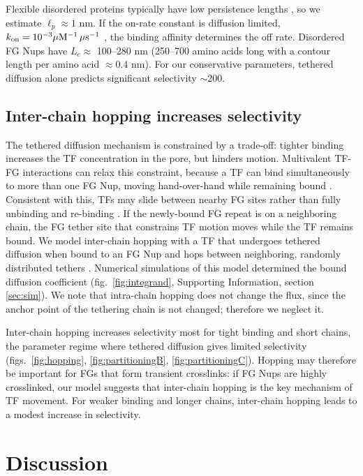 Flexible disordered proteins typically have low persistence lengths
\cite{receveur-brechot12}, so we estimate $\ell_p \approx 1$ nm.  If
the on-rate constant is diffusion limited,
$k_{\rm on} = 10^{-3}\mu \mathrm{M}^{-1} \, \mu \mathrm{s}^{-1}$ \cite{milles15,
  hough15}, the binding affinity determines the off rate.  Disordered
FG Nups have $L_c\approx$ 100--280 nm (250--700 amino acids long
\cite{patel07} with a contour length per amino acid $\approx 0.4$
nm). For our conservative parameters, tethered diffusion alone
predicts significant selectivity $\sim$200.

\subsection*{Inter-chain hopping increases selectivity}
The tethered diffusion mechanism is constrained by a trade-off:
tighter binding increases the TF concentration in the pore, but
hinders motion.  Multivalent TF-FG interactions can relax this
constraint, because a TF can bind simultaneously to more than one FG
Nup, moving hand-over-hand while remaining bound
\cite{tetenbaum-novatt12}. Consistent with this, TFs may slide between
nearby FG sites rather than fully unbinding and re-binding
\cite{raveh16}. If the newly-bound FG repeat is on a neighboring
chain, the FG tether site that constrains TF motion moves while the TF
remains bound.  We model inter-chain hopping with a TF that undergoes
tethered diffusion when bound to an FG Nup and hops between
neighboring, randomly distributed tethers .
Numerical simulations of this model determined the bound diffusion
coefficient (fig.~\ref{fig:integrand}, Supporting Information, section
\ref{sec:sim}). We note that intra-chain hopping does not change the
flux, since the anchor point of the tethering chain is not changed;
therefore we neglect it.

Inter-chain hopping increases selectivity most for tight binding and
short chains, the parameter regime where tethered diffusion gives
limited selectivity (figs.~\ref{fig:hopping}, \ref{fig:partitioningB},
\ref{fig:partitioningC}). Hopping may therefore be important for FGs
that form transient crosslinks: if FG Nups are highly crosslinked, our
model suggests that inter-chain hopping is the key mechanism of TF
movement.  For weaker binding and longer chains, inter-chain hopping
leads to a modest increase in selectivity.

\section*{Discussion}

